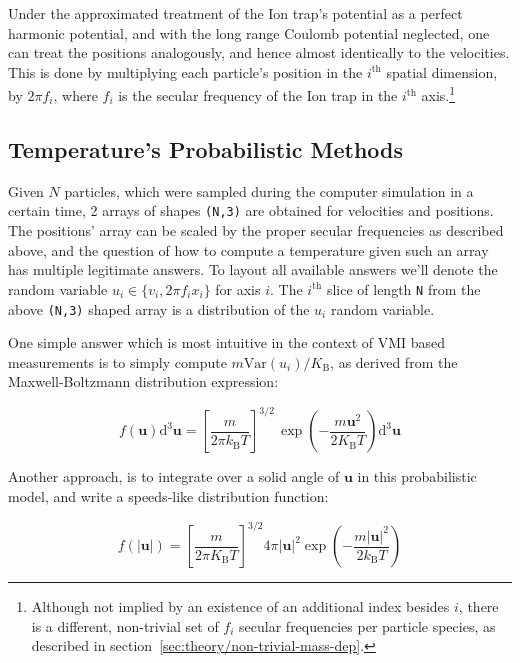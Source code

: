 Under the approximated treatment of the Ion trap's potential as a perfect harmonic potential, and with the long range Coulomb potential neglected, one can treat the positions analogously, and hence almost identically to the velocities. This is done by multiplying each particle's position in the $i^\mathrm{th}$ spatial dimension, by $2\pi f_i$, where $f_i$ is the secular frequency of the Ion trap in the $i^\mathrm{th}$ axis.\footnote{Although not implied by an existence of an additional index besides $i$, there is a different, non-trivial set of $f_i$ secular frequencies per particle species, as described in section~\ref{sec:theory/non-trivial-mass-dep}.}

\subsection{Temperature's Probabilistic Methods}\label{ssec:T_method}

Given $N$ particles, which were sampled during the computer simulation in a certain time, 2 arrays of shapes \texttt{(N,3)} are obtained for velocities and positions. The positions' array can be scaled by the proper secular frequencies as described above, and the question of how to compute a temperature given such an array has multiple legitimate answers. To layout all available answers we'll denote the random variable $u_i \in \{v_i, 2\pi f_i x_i\}$ for axis $i$. The $i^\mathrm{th}$ slice of length \texttt{N} from the above \texttt{(N,3)} shaped array is a distribution of the $u_i$ random variable.

One simple answer which is most intuitive in the context of VMI based measurements is to simply compute $m \mathrm{Var}(u_i)/K_\text{B}$, as derived from the Maxwell-Boltzmann distribution expression:

\begin{equation}
    f(\mathbf{u}) \mathrm{d}^{3}\mathbf{u} = \left[\frac{m}{2\pi k_{\text{B}}T}\right]^{3/2}\,\exp \left(-{\frac {m \mathbf{u}^2}{2K_\text{B} T}}\right) \mathrm{d}^{3}\mathbf{u}
\end{equation}

Another approach, is to integrate over a solid angle of $\mathbf{u}$ in this probabilistic model, and write a speeds-like distribution function:

\begin{equation}
    f(|\mathbf{u}|) = \left[{\frac{m}{2\pi K_\text{B} T}}\right]^{3/2} 4\pi |\mathbf{u}|^{2}\exp\left(-{\frac{m |\mathbf{u}|^{2}}{2k_{\text{B}}T}}\right)
\end{equation}

